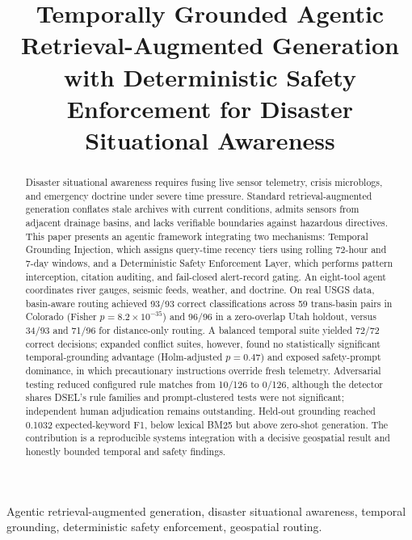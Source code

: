 \documentclass[conference]{IEEEtran}
\begin{document}
\title{Temporally Grounded Agentic Retrieval-Augmented Generation with Deterministic Safety Enforcement for Disaster Situational Awareness}
\author{
}
\maketitle
\begin{abstract}
Disaster situational awareness requires fusing live sensor telemetry, crisis microblogs, and emergency doctrine under severe time pressure. Standard retrieval-augmented generation conflates stale archives with current conditions, admits sensors from adjacent drainage basins, and lacks verifiable boundaries against hazardous directives. This paper presents an agentic framework integrating two mechanisms: Temporal Grounding Injection, which assigns query-time recency tiers using rolling 72-hour and 7-day windows, and a Deterministic Safety Enforcement Layer, which performs pattern interception, citation auditing, and fail-closed alert-record gating. An eight-tool agent coordinates river gauges, seismic feeds, weather, and doctrine. On real USGS data, basin-aware routing achieved 93/93 correct classifications across 59 trans-basin pairs in Colorado (Fisher $p=8.2\times10^{-35}$) and 96/96 in a zero-overlap Utah holdout, versus 34/93 and 71/96 for distance-only routing. A balanced temporal suite yielded 72/72 correct decisions; expanded conflict suites, however, found no statistically significant temporal-grounding advantage (Holm-adjusted $p=0.47$) and exposed safety-prompt dominance, in which precautionary instructions override fresh telemetry. Adversarial testing reduced configured rule matches from 10/126 to 0/126, although the detector shares DSEL's rule families and prompt-clustered tests were not significant; independent human adjudication remains outstanding. Held-out grounding reached 0.1032 expected-keyword F1, below lexical BM25 but above zero-shot generation. The contribution is a reproducible systems integration with a decisive geospatial result and honestly bounded temporal and safety findings.
\end{abstract}
\begin{IEEEkeywords}
Agentic retrieval-augmented generation, disaster situational awareness, temporal grounding, deterministic safety enforcement, geospatial routing.
\end{IEEEkeywords}
\end{document}
